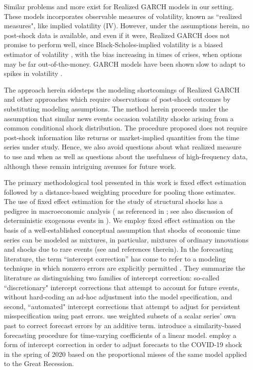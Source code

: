 \documentclass[11pt,3p,review,authoryear]{elsarticle}
\theoremstyle{definition}
\begin{document}
Similar problems and more exist for Realized GARCH models \citep{hansen2012realized} in our setting. These models incorporates observable measures of volatility, known as  ``realized measures", like implied volatility (IV). However, under the assumptions herein, no post-shock data is available, and even if it were, Realized GARCH does not promise to perform well, since Black-Scholes-implied volatility is a biased estimator of volatility \citep{mayhew1995implied, christensen1998relation}, with the bias increasing in times of crises, when options may be far out-of-the-money.  GARCH models have been shown slow to adapt to spikes in volatility \citep{andersen2003modeling}.

The approach herein sidesteps the modeling shortcomings of Realized GARCH and other approaches which require observations of post-shock outcomes
by substituting modeling assumptions.  The method herein proceeds under the assumption that similar news events occasion volatility shocks arising from a common conditional shock distribution.  The procedure proposed does not require post-shock information like returns or market-implied quantities from the time series under study.  Hence, we also avoid questions about what realized measure to use and when as well as questions about the usefulness of high-frequency data, although these remain intriguing avenues for future work.

The primary methodological tool presented in this work is fixed effect estimation followed by a distance-based weighting procedure for pooling those estimates.  The use of fixed effect estimation for the study of structural shocks has a pedigree in macroeconomic analysis (\citet{romer1989does} as referenced in \citet{kilian2017structural}; see also discussion of deterministic exogenous events in \citet{engle2001good}).  We employ fixed effect estimation on the basis of a well-established conceptual assumption that shocks of economic time series can be modeled as mixtures, in particular, mixtures of ordinary innovations and shocks due to rare events (see \cite{phillips1996forecasting} and references therein).  In the forecasting literature, the term ``intercept correction'' has come to refer to a modeling technique in which nonzero errors are explicitly permitted \citep{hendry1994theory, clements1998forecasting}.  They summarize the literature as distinguishing two families of intercept correction: so-called ``discretionary" intercept corrections that attempt to account for future events, without hard-coding an ad-hoc adjustment into the model specification, and second, ``automated" intercept corrections that attempt to adjust for persistent misspecification using past errors.  \citet{guerron2017macroeconomic} use weighted subsets of a scalar series' own past to correct forecast errors by an additive term. \citet{dendramis2020similarity} introduce a similarity-based forecasting procedure for time-varying coefficients of a linear model. \citet{foroni2022forecasting} employ a form of intercept correction in order to adjust forecasts to the COVID-19 shock in the spring of 2020 based on the proportional misses of the same model applied to the Great Recession.
\end{document}
